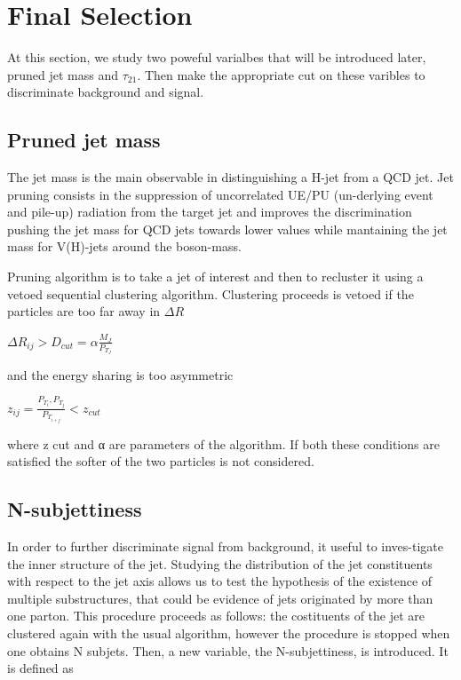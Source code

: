 \documentclass[12pt]{article} %
\begin{document}
\newpage



\section{Final Selection} 

At this section, we study two poweful varialbes that will be introduced later, pruned jet mass and $\tau_{21}$. Then make the appropriate cut on these varibles to discriminate background and signal.

\subsection{Pruned jet mass}

The jet mass is the main observable in distinguishing a H-jet from a QCD jet. Jet pruning consists in the suppression of uncorrelated UE/PU (un-derlying event and pile-up) radiation from the target jet and improves the discrimination pushing the jet mass for QCD jets towards lower values while mantaining the jet mass for V(H)-jets around the boson-mass.

Pruning algorithm is to take a jet of interest and then to recluster it using a vetoed sequential clustering algorithm. Clustering proceeds is vetoed if the particles are too far away in $\Delta$$R$

$\Delta$$R_{ij} > D_{cut} = $$\alpha$$\frac{M_{J}}{P_{T_{J}}}$

and the energy sharing is too asymmetric

$z_{ij} = \frac{P_{T_{i}},P_{T_{j}}}{P_{T_{i+j}}} < z_{cut}$

where z cut and α are parameters of the algorithm. If both these conditions
are satisfied the softer of the two particles is not considered.


\subsection{N-subjettiness}

In order to further discriminate signal from background, it useful to inves-tigate the inner structure of the jet. Studying the distribution of the jet constituents with respect to the jet axis allows us to test the hypothesis of the existence of multiple substructures, that could be evidence of jets originated by more than one parton. This procedure proceeds as follows: the costituents of the jet are clustered again with the usual algorithm, however the procedure is stopped when one obtains N subjets. Then, a new variable, the N-subjettiness, is introduced. It is defined as
\end{document}
